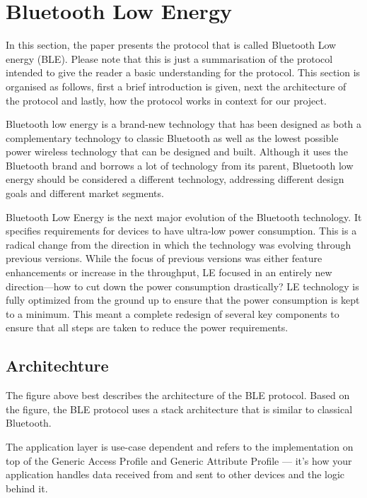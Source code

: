 \section{Bluetooth Low Energy}

In this section, the paper presents the protocol that is called Bluetooth Low energy (BLE). Please note that this is just a summarisation of the protocol intended to give the reader a basic understanding for the protocol. This section is organised as follows, first a brief introduction is given, next the architecture of the protocol and lastly, how the protocol works in context for our project.

Bluetooth low energy is a brand-new technology that has been designed as both a complementary technology to classic Bluetooth as well as the lowest possible power wireless technology that can be designed and built. Although it uses the Bluetooth brand and borrows a lot of technology from its parent, Bluetooth low energy should be considered a different technology, addressing different design goals and different market segments.

Bluetooth Low Energy is the next major evolution of the Bluetooth technology. It specifies requirements for devices to have ultra-low power consumption. This is a radical change from the direction in which the technology was evolving through previous versions. While the focus of previous versions was either feature enhancements or increase in the throughput, LE focused in an entirely new direction—how to cut down the power consumption drastically? LE technology is fully optimized from the ground up to ensure that the power consumption is kept to a minimum. This meant a complete redesign of several key components to ensure that all steps are taken to reduce the power requirements.

\subsection{Architechture}

The figure above best describes the architecture of the BLE protocol. Based on the figure, the BLE protocol uses a stack architecture that is similar to classical Bluetooth. 

The application layer is use-case dependent and refers to the implementation on top of the Generic Access Profile and Generic Attribute Profile — it’s how your application handles data received from and sent to other devices and the logic behind it.

